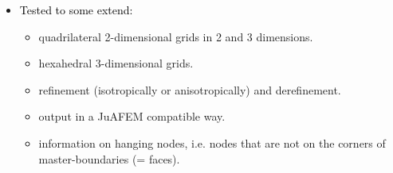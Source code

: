 \documentclass{article}
\begin{document}
\begin{itemize}
    \item \textcolor{black}{Tested to some extend:} 
    \begin{itemize}
        \item quadrilateral 2-dimensional grids in 2 and 3 dimensions.
        \item  hexahedral 3-dimensional grids.
        \item refinement (isotropically or anisotropically) and derefinement. 
        \item output in a JuAFEM compatible way.
        \item information on hanging nodes, i.e. nodes that are not on the corners of master-boundaries (= faces).
    \end{itemize}
    

\end{itemize}
\end{document}
